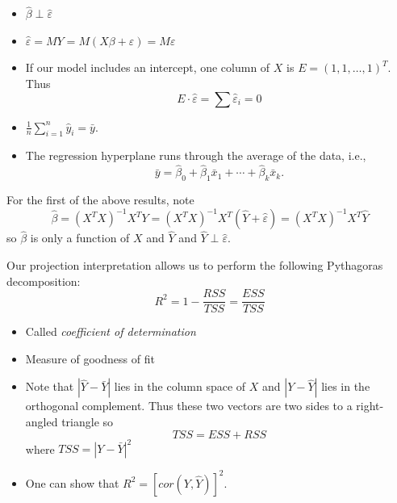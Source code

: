 \documentclass[11pt, %
	oneside, %
	english, %
	onehalfspacing, %
	]{article} %
\numberwithin{equation}{section}
\begin{document}
\begin{itemize}
    \item $\hat{\beta} \perp \hat{\varepsilon}$
    \item $\hat{\varepsilon} = MY = M(X \beta + \varepsilon) = M \varepsilon$
    \item If our model includes an intercept, one column of $X$ is $E = (1,1, \ldots, 1)^T$. Thus
    \begin{equation*}
        E \cdot \hat{\varepsilon} = \sum \hat{\varepsilon}_i = 0
    \end{equation*}
    \item $\frac{1}{n} \sum_{i=1}^n \hat{y}_i=\bar{y} .$
    \item The regression hyperplane runs through the average of the data, i.e.,
    \begin{equation*}
        \bar{y}=\hat{\beta}_0+\hat{\beta}_1 \bar{x}_1+\cdots+\hat{\beta}_k \bar{x}_k .
    \end{equation*}
\end{itemize}

For the first of the above results, note
\begin{equation*}
    \hat{\beta}=\left(X^T X\right)^{-1} X^T Y=\left(X^T X\right)^{-1} X^T(\hat{Y}+\hat{\varepsilon})=\left(X^T X\right)^{-1} X^T \hat{Y}
\end{equation*}
so $\hat{\beta}$ is only a function of $X$ and $\hat{Y}$ and $\hat{Y} \perp \hat{\varepsilon}$.

Our projection interpretation allows us to perform the following Pythagoras decomposition:
\begin{equation*}
	R^2=1-\frac{R S S}{T S S}=\frac{E S S}{T S S}
\end{equation*}
\begin{itemize}
    \item Called \emph{coefficient of determination}
    \item Measure of goodness of fit
    \item Note that $|\hat{Y}-\bar{Y}|$ lies in the column space of $X$ and $|Y-\hat{Y}|$ lies in the orthogonal complement. Thus these two vectors are two sides to a right-angled triangle so
    \begin{equation*}
        TSS = ESS + RSS
    \end{equation*}
    where $TSS = |Y-\bar{Y}|^2$
    \item One can show that $R^2 = \left[cor(Y, \hat{Y})\right]^2$.
\end{itemize}
\end{document}
